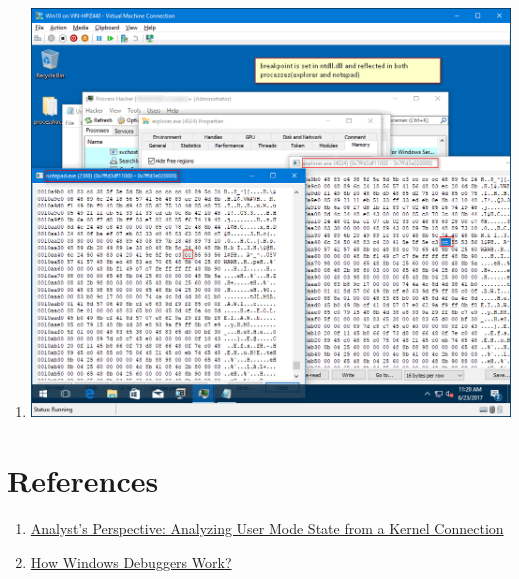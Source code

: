\documentclass{article}
\begin{document}
\begin{enumerate}[noitemsep]
    \item
    \begin{minipage}{\linewidth}
    \includegraphics[width=\linewidth]{UsermodeBreakPointFromKD5.png}
    \end{minipage}
\end{enumerate}
\section{References}
\begin{enumerate}[noitemsep]
\item \href{http://www.osronline.com/article.cfm?id=576}{Analyst's Perspective: Analyzing User Mode State from a Kernel Connection}
\item \href{https://www.microsoftpressstore.com/articles/article.aspx?p=2201303&seqNum=2}{How Windows Debuggers Work?}
\end{enumerate}
\end{document}

